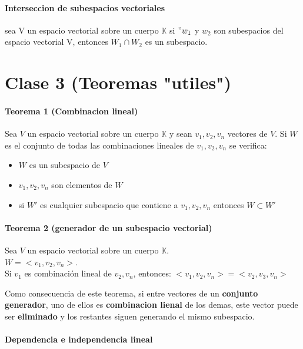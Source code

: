 \documentclass[10pt]{article}
\begin{document}
\paragraph{Interseccion de subespacios vectoriales}
sea V un espacio vectorial sobre un cuerpo $\mathbb{K}$ si $"w_1$ y $w_2$ son subespacios del espacio vectorial V, entonces $W_1 \cap W_2$ es un subespacio.

\section{Clase 3 (Teoremas "utiles")}

\paragraph{Teorema 1 (Combinacion lineal)}
Sea $V$ un espacio vectorial sobre un cuerpo $\mathbb{K}$ y sean $v_1, v_2, v_n$ vectores de $V$. Si $W$ es el conjunto de todas las combinaciones lineales de $v_1, v_2, v_n$ se verifica:

\begin{itemize}
	\item $W$ es un subespacio de $V$
	\item $v_1, v_2, v_n$ son elementos de $W$
	\item si $W'$ es cualquier subespacio que contiene a $v_1, v_2, v_n$ entonces $W \subset W'$
\end{itemize}

\paragraph{Teorema 2 (generador de un subespacio vectorial)}

Sea $V$ un espacio vectorial sobre un cuerpo $\mathbb{K}$.\\
$W = <v_1, v_2, v_n>$.\\
Si $v_1$ es combinación lineal de $ v_2, v_n$, entonces: $<v_1, v_2, v_n> = < v_2, v_3, v_n>$

\begin{center}
Como consecuencia de este teorema, si entre vectores de un \textbf{conjunto generador}, uno de ellos es \textbf{combinacion lienal} de los demas, este vector puede ser \textbf{eliminado} y los restantes siguen generando el mismo subespacio.
\end{center}

\paragraph{Dependencia e independencia lineal}
\end{document}
